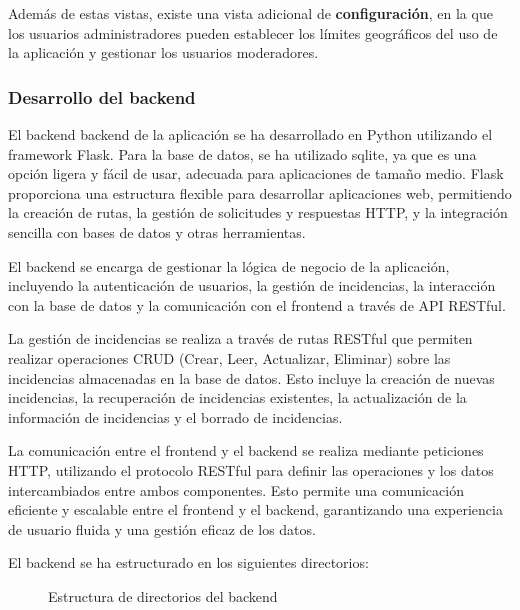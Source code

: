 \documentclass{article}
\begin{document}
Además de estas vistas, existe una vista adicional de \textbf{configuración}, en la que los usuarios administradores pueden establecer los límites geográficos del uso de la aplicación y gestionar los usuarios moderadores.

\subsubsection{Desarrollo del backend}

El backend backend de la aplicación se ha desarrollado en Python utilizando el framework Flask. Para la base de datos, se ha utilizado sqlite, ya que es una opción ligera y fácil de usar, adecuada para aplicaciones de tamaño medio. Flask proporciona una estructura flexible para desarrollar aplicaciones web, permitiendo la creación de rutas, la gestión de solicitudes y respuestas HTTP, y la integración sencilla con bases de datos y otras herramientas.

El backend se encarga de gestionar la lógica de negocio de la aplicación, incluyendo la autenticación de usuarios, la gestión de incidencias, la interacción con la base de datos y la comunicación con el frontend a través de API RESTful.

La gestión de incidencias se realiza a través de rutas RESTful que permiten realizar operaciones CRUD (Crear, Leer, Actualizar, Eliminar) sobre las incidencias almacenadas en la base de datos. Esto incluye la creación de nuevas incidencias, la recuperación de incidencias existentes, la actualización de la información de incidencias y el borrado de incidencias.

La comunicación entre el frontend y el backend se realiza mediante peticiones HTTP, utilizando el protocolo RESTful para definir las operaciones y los datos intercambiados entre ambos componentes. Esto permite una comunicación eficiente y escalable entre el frontend y el backend, garantizando una experiencia de usuario fluida y una gestión eficaz de los datos.

El backend se ha estructurado en los siguientes directorios:

\begin{figure}[H]
    \centering
    \begin{minipage}{0.4\textwidth}
    \end{minipage}
    \caption{Estructura de directorios del backend}
    \label{fig:estructura_directorios_backend}
\end{figure}
\end{document}
